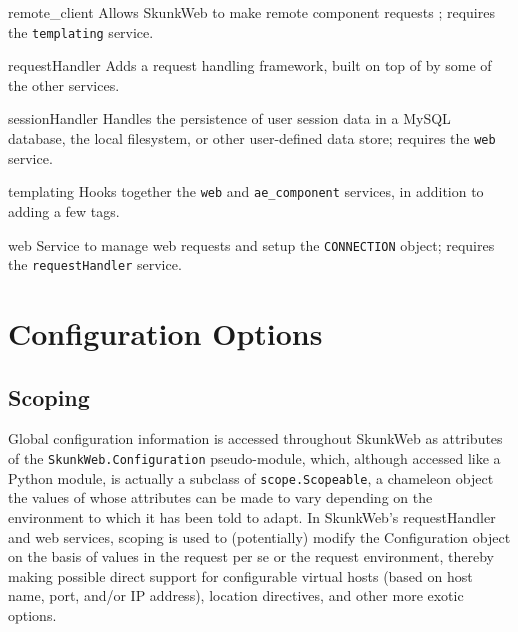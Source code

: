 \documentclass[titlepage]{manual}
\begin{document}
\begin{argdesc}
\item[remote_client] Allows SkunkWeb to make remote component requests
; requires the \texttt{templating} service.

\item[requestHandler]  Adds a request handling framework, built on top
of by some of the other services.

\item[sessionHandler]  Handles the persistence of user session data in
a MySQL database, the local filesystem, or other user-defined data store; 
requires the \texttt{web} service.

\item[templating] Hooks together the \texttt{web} and \texttt{ae_component}
services, in addition to adding a few tags.


\item[web] Service to manage web requests and setup the
\texttt{CONNECTION} object; requires the \texttt{requestHandler} service.
\end{argdesc}

\section{Configuration Options}

\subsection{Scoping}

Global configuration information is accessed throughout SkunkWeb as attributes of the 
\texttt{SkunkWeb.Configuration} pseudo-module, which, although accessed like a Python module,
is actually a subclass of \texttt{scope.Scopeable}, a chameleon object the values of whose attributes can be 
made to vary depending on the environment to which it has been told to adapt.
In SkunkWeb's requestHandler and web services, scoping is used to (potentially) modify the Configuration
object on the basis of values in the request per se or the request environment, thereby making possible
direct support for configurable virtual hosts (based on host name, port, and/or IP address), 
location directives, and other more exotic options.
\end{document}

